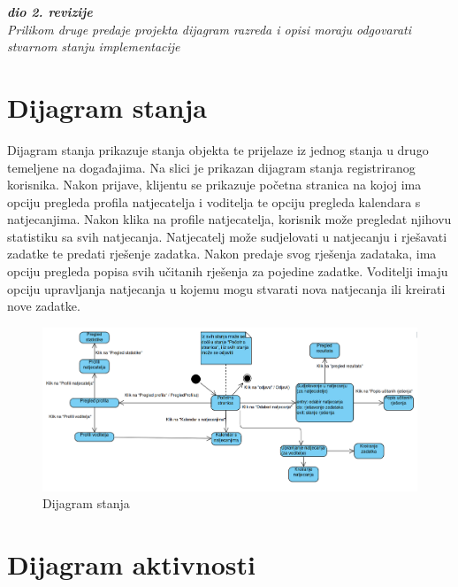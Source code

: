 			\textbf{\textit{dio 2. revizije}}\\			
			
			\textit{Prilikom druge predaje projekta dijagram razreda i opisi moraju odgovarati stvarnom stanju implementacije}
			
			
			
			\eject
		
		\section{Dijagram stanja}

			Dijagram stanja prikazuje stanja objekta te prijelaze iz jednog stanja u drugo temeljene na događajima.
			Na slici je prikazan dijagram stanja registriranog korisnika.
			Nakon prijave, klijentu se prikazuje početna stranica na kojoj ima opciju pregleda profila natjecatelja i voditelja te opciju pregleda kalendara s natjecanjima. Nakon klika na profile natjecatelja, korisnik može pregledat njihovu statistiku sa svih natjecanja. 
			Natjecatelj može sudjelovati u natjecanju i rješavati zadatke te predati rješenje zadatka. Nakon predaje svog rješenja zadataka, ima opciju pregleda popisa svih učitanih rješenja za pojedine zadatke.
			Voditelji imaju opciju upravljanja natjecanja u kojemu mogu stvarati nova natjecanja ili kreirati nove zadatke.
			\eject
				
			\begin{figure}[H]
				\includegraphics[width=\linewidth]{slike/dijagram_stanja.png} 
				\centering
				\caption{Dijagram stanja}
				\label{fig:stanja}
			\end{figure}
			
			\eject 
		
		\section{Dijagram aktivnosti}
			
